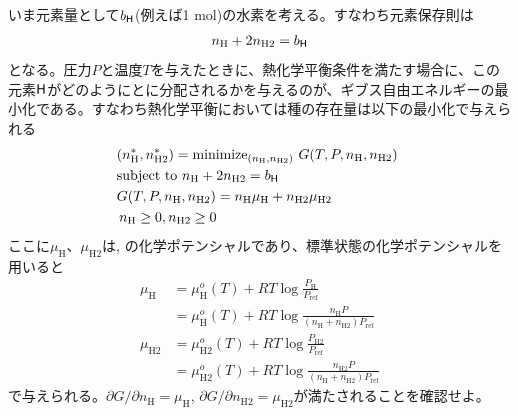 いま元素量として$b_{\mathsf{H}}$(例えば1 mol)の水素を考える。すなわち元素保存則は
\begin{align}
    n_\mathrm{H} + 2 n_\mathrm{H2}  = b_{\mathsf{H}} 
\end{align}
となる。圧力$P$と温度$T$を与えたときに、熱化学平衡条件を満たす場合に、この元素$\mathsf{H}$がどのようにとに分配されるかを与えるのが、ギブス自由エネルギーの最小化である。すなわち熱化学平衡においては種の存在量は以下の最小化で与えられる
\begin{align}
\label{eq:opt1tce}
    &(n_\mathrm{H}^\ast, n_\mathrm{H2}^\ast) = \mathrm{minimize}_{(n_\mathrm{H}, n_\mathrm{H2})} \,\, G(T, P, n_\mathrm{H}, n_\mathrm{H2}) \,\, \\ 
    &\mbox{subject to} \,\, n_\mathrm{H} + 2 n_\mathrm{H2} =  b_{\mathsf{H}}  \\
    &G(T, P, n_\mathrm{H}, n_\mathrm{H2}) = n_\mathrm{H} \mu_\mathrm{H} + n_\mathrm{H2} \mu_\mathrm{H2} \\
     &\, n_\mathrm{H} \ge 0, n_\mathrm{H2} \ge 0
\end{align}
ここに$\mu_\mathrm{H}$、$ \mu_\mathrm{H2}$は, の化学ポテンシャルであり、標準状態の化学ポテンシャルを用いると
\begin{align}
    \mu_\mathrm{H} &= \mu_\mathrm{H}^o(T) + RT \log{\frac{P_\mathrm{H}}{P_\mathrm{ref}}} \\
    &=  \mu_\mathrm{H}^o(T) + RT \log{\frac{n_\mathrm{H} P}{(n_\mathrm{H} + n_\mathrm{H2}) P_\mathrm{ref}}} \\
    \mu_\mathrm{H2} &= \mu_\mathrm{H2}^o(T) + RT \log{\frac{P_\mathrm{H2}}{P_\mathrm{ref}}} \\
    &=  \mu_\mathrm{H2}^o(T) + RT\log{\frac{n_\mathrm{H2} P}{(n_\mathrm{H} + n_\mathrm{H2}) P_\mathrm{ref}}}
\end{align}
で与えられる。$\partial G/\partial n_\mathrm{H} = \mu_\mathrm{H}$, $\partial G/\partial n_\mathrm{H2} = \mu_\mathrm{H2}$が満たされることを確認せよ。

